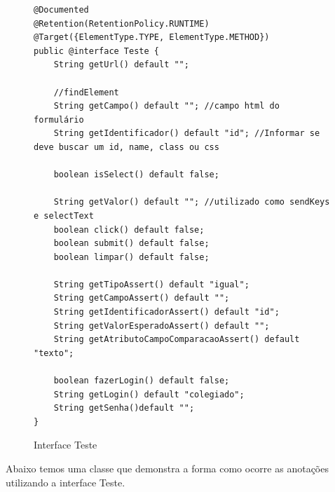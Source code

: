 \documentclass[tg]{mdtufsm}
\begin{document}
\begin{figure}[!htb]
\begin{lstlisting}
@Documented
@Retention(RetentionPolicy.RUNTIME)
@Target({ElementType.TYPE, ElementType.METHOD})
public @interface Teste {
    String getUrl() default "";

    //findElement
    String getCampo() default ""; //campo html do formulário
    String getIdentificador() default "id"; //Informar se deve buscar um id, name, class ou css

    boolean isSelect() default false;

    String getValor() default ""; //utilizado como sendKeys e selectText
    boolean click() default false;
    boolean submit() default false;
    boolean limpar() default false;

    String getTipoAssert() default "igual";
    String getCampoAssert() default "";
    String getIdentificadorAssert() default "id";
    String getValorEsperadoAssert() default "";
    String getAtributoCampoComparacaoAssert() default "texto";

    boolean fazerLogin() default false;
    String getLogin() default "colegiado";
    String getSenha()default "";
}
\end{lstlisting}
	\caption{Interface Teste}
	\label{code:Teste.java}
\end{figure}

Abaixo temos uma classe que demonstra a forma como ocorre as anotações utilizando a interface Teste.
\end{document}
